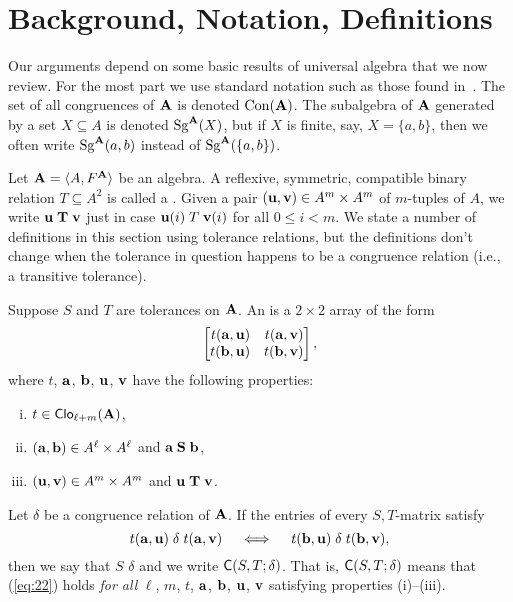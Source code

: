 \section{Background, Notation, Definitions}
\label{sec:definitions}
Our arguments depend on some basic results of universal algebra that we now review.
For the most part we use standard notation such as those found in~\cite{MR2839398}.
The set of all congruences of $\mathbf{A}$ is
denoted $\operatorname{Con}(\mathbf{A})$. The subalgebra of $\mathbf{A}$ generated by a set $X \subseteq A$ 
is denoted $\operatorname{Sg}^{\mathbf{A}}(X)$, but if $X$ is finite, say, $X = \{a,b\}$, then we
often write $\operatorname{Sg}^{\mathbf{A}}(a,b)$ instead of $\operatorname{Sg}^{\mathbf{A}}(\{a,b\})$.


Let $\mathbf{A} = \langle A, F^{\mathbf{A}}\rangle$ be an algebra.
A reflexive, symmetric, compatible binary relation $T\subseteq A^2$ is called a
.  
Given a pair $(\mathbf{u}, \mathbf{v}) \in A^m\times A^m$ of $m$-tuples of $A$, we write 
$\mathbf{u} \mathrel{\mathbf{T}} \mathbf{v}$ just in case $\mathbf{u}(i) \mathrel{T} \mathbf{v}(i)$ for all $0\leq i<m$. 
We state a number of definitions in this section using tolerance relations, but 
the definitions don't change when the tolerance in question happens to be
a congruence relation (i.e., a transitive tolerance).

Suppose $S$ and $T$ are tolerances on $\mathbf{A}$.  An  
is a $2\times 2$ array of the form
\[
\begin{bmatrix*}[r] t(\ba,\bu) & t(\ba,\bv)\\ t(\bb,\bu)&t(\bb,\bv)\end{bmatrix*},
\]
where $t$, $\mathbf{a}$, $\mathbf{b}$, $\mathbf{u}$, $\mathbf{v}$ have the following properties:
\begin{enumerate}[(i)] %
\item $t\in \operatorname{\mathsf{Clo}}_{\ell + m}(\mathbf{A})$,
\item $(\mathbf{a}, \mathbf{b})\in A^\ell\times A^\ell$ and $\mathbf{a} \mathrel{\mathbf{S}} \mathbf{b}$,
\item $(\mathbf{u}, \mathbf{v})\in A^m\times A^m$ and $\mathbf{u} \mathrel{\mathbf{T}} \mathbf{v}$.
\end{enumerate}
Let $\delta$ be a congruence relation of $\mathbf{A}$.
If the entries of every $S,T$-matrix satisfy
\begin{equation}
  \label{eq:22}
t(\ba,\bu) \mathrel{\delta} t(\ba,\bv)\quad \iff \quad t(\bb,\bu) \mathrel{\delta} t(\bb,\bv),
\end{equation}
then we say that $S$  $\delta$ and we write 
$\mathsf{C}(S, T; \delta)$.
That is, $\mathsf{C}(S, T; \delta)$  means that 
(\ref{eq:22}) holds \emph{for all}
$\ell$, $m$, $t$, $\mathbf{a}$, $\mathbf{b}$, $\mathbf{u}$, $\mathbf{v}$ satisfying properties (i)--(iii).

